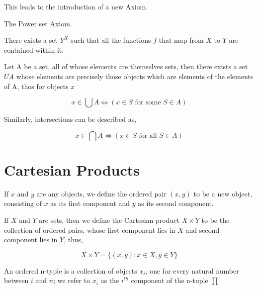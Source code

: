 \documentclass[11pt]{report}
\begin{document}
This leads to the introduction of a new Axiom.

The Power set Axiom.

There exists a set $Y^X$ such that all the functions $f$ that map from $X$ to $Y$ are contained within it.

\begin{definition}[Union]
	Let A be a set, all of whose elements are themselves sets, then there exists a set $UA$ whose elements are precisely those objects which are elements of the elements of A, thos for objects $x$

	$$x \in \bigcup A \Leftrightarrow (x \in S \text{ for some } S \in A)$$
\end{definition}

Similarly, intersections can be described as,

\begin{definition}[Intersections]
	$$x \in \bigcap A \Leftrightarrow (x \in S \text{ for all } S \in A)$$
\end{definition}

\section{Cartesian Products}

\begin{definition}
	If $x$ and $y$ are any objects, we define the ordered pair $(x,y)$ to be a new object, consisting of $x$ as its first component and $y$ as its second component.
\end{definition}

\begin{definition}
	If $X$ and $Y$ are sets, then we define the Cartesian product $X \times Y$ to be the collection of ordered pairs, whose first component lies in $X$ and second component lies in $Y$, thus,

	\[ X \times Y = \{(x,y): x \in X, y \in Y\}\]
\end{definition}


\begin{definition}
	An ordered n-typle is a collection of objects $x_i$, one for every natural number between $i$ and $n$; we refer to $x_i$ as the $i^{th}$ component of the n-tuple $\prod$
\end{definition}
\end{document}
